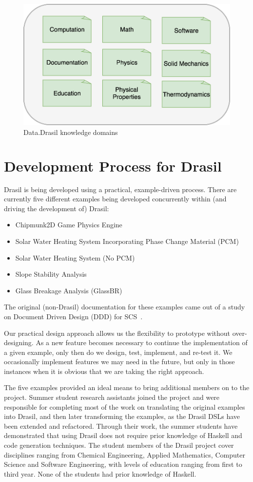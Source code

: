 \documentclass[sigconf]{acmart}
\begin{document}
\begin{figure}
	\includegraphics[width=.5\textwidth]{figures/ontology.png}
	\caption{Data.Drasil knowledge domains}
	\label{ontology}
\end{figure}

\section{Development Process for Drasil} \label{SecDevProcess}

Drasil is being developed using a practical, example-driven process. There are 
currently five different examples being developed concurrently within (and 
driving the development of) Drasil:

\begin{itemize}
\item Chipmunk2D Game Physics Engine
\item Solar Water Heating System Incorporating Phase Change Material (PCM)
\item Solar Water Heating System (No PCM)
\item Slope Stability Analysis
\item Glass Breakage Analysis (GlassBR)
\end{itemize}
The original (non-Drasil) documentation for these examples came out of a study
on Document Driven Design (DDD) for SCS~\cite{SmithJegatheesanAndKelly2016}.

Our practical design approach allows us the flexibility to prototype without 
over-designing. As a new feature becomes necessary to continue the 
implementation of a given example, only then do we design, test, implement, and 
re-test it. We occasionally implement features we may need in the future, but 
only in those instances when it is obvious that we are taking the right 
approach.

The five examples provided an ideal means to bring additional members on to the
project.  Summer student research assistants joined the project and were
responsible for completing most of the work on translating the original examples
into Drasil, and then later transforming the examples, as the Drasil DSLs have
been extended and refactored.  Through their work, the summer students have
demonstrated that using Drasil does not require prior knowledge of Haskell and
code generation techniques.  The student members of the Drasil project cover
disciplines ranging from Chemical Engineering, Applied Mathematics, Computer
Science and Software Engineering, with levels of education ranging from first to
third year. None of the students had prior knowledge of Haskell.
\end{document}
